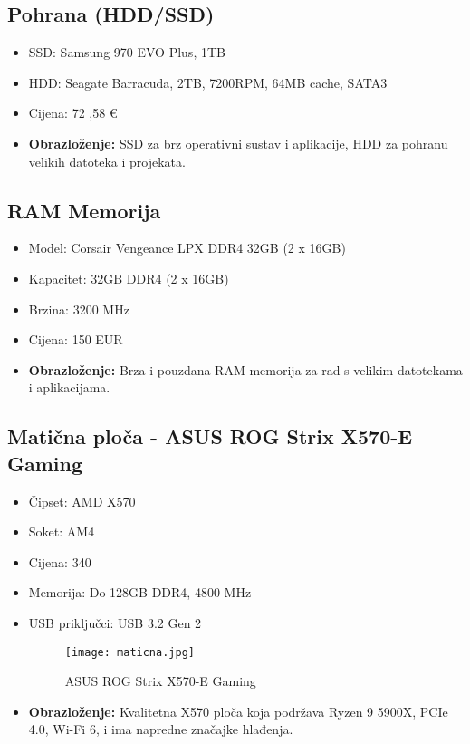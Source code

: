\documentclass[30pt, letterpaper,utf8,a4paper]{article}
\begin{document}
\subsection{Pohrana (HDD/SSD)}
\begin{itemize}
    \item SSD: Samsung 970 EVO Plus, 1TB
    \item HDD: Seagate Barracuda, 2TB, 7200RPM, 64MB cache, SATA3
      \item Cijena: 72 ,58 €

    \item\textbf{Obrazloženje:} SSD za brz operativni sustav i aplikacije, HDD za pohranu velikih datoteka i projekata.
\end{itemize}


\subsection{RAM Memorija}
\begin{itemize}
\item Model: Corsair Vengeance LPX DDR4 32GB (2 x 16GB)
    \item Kapacitet: 32GB DDR4 (2 x 16GB)
    \item Brzina: 3200 MHz
    \item Cijena: 150 EUR
    \item \textbf{Obrazloženje:} Brza i pouzdana RAM memorija za rad s velikim datotekama i aplikacijama.
\end{itemize}



\subsection{Matična ploča - ASUS ROG Strix X570-E Gaming}
\begin{itemize}
    \item {Čipset:} AMD X570
    \item Soket: AM4
      \item Cijena: 340
    \item {Memorija:} Do 128GB DDR4, 4800 MHz 
    \item {USB priključci:} USB 3.2 Gen 2
\begin{figure}[h]
    \centering
    \texttt{[image: maticna.jpg]}
    \caption{ASUS ROG Strix X570-E Gaming}
        \end{figure}
\item \textbf{Obrazloženje:} Kvalitetna X570 ploča koja podržava Ryzen 9 5900X, PCIe 4.0, Wi-Fi 6, i ima napredne značajke hlađenja.

\end{itemize}
\end{document}

